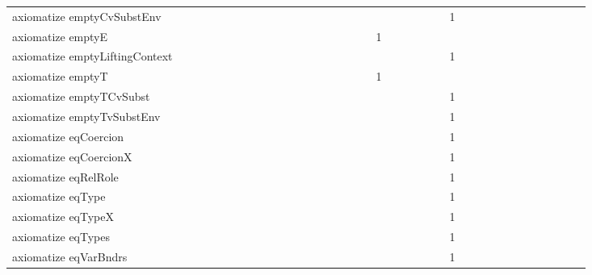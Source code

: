 {\begin{tabular}{l|rrr|rrr|rrr}
axiomatize emptyCvSubstEnv &  &  &  &  &  &  &  &  &  &  &  &  &  &  &  &  &  &  &  &  &  &  &  & 1 &  &  &  &  &  &  &  &  &  &  &  & \\
axiomatize emptyE &  &  &  &  &  &  &  &  &  &  &  &  &  &  &  &  &  & 1 &  &  &  &  &  &  &  &  &  &  &  &  &  &  &  &  &  & \\
axiomatize emptyLiftingContext &  &  &  &  &  &  &  &  &  &  &  &  &  &  &  &  &  &  &  &  &  &  &  & 1 &  &  &  &  &  &  &  &  &  &  &  & \\
axiomatize emptyT &  &  &  &  &  &  &  &  &  &  &  &  &  &  &  &  &  & 1 &  &  &  &  &  &  &  &  &  &  &  &  &  &  &  &  &  & \\
axiomatize emptyTCvSubst &  &  &  &  &  &  &  &  &  &  &  &  &  &  &  &  &  &  &  &  &  &  &  & 1 &  &  &  &  &  &  &  &  &  &  &  & \\
axiomatize emptyTvSubstEnv &  &  &  &  &  &  &  &  &  &  &  &  &  &  &  &  &  &  &  &  &  &  &  & 1 &  &  &  &  &  &  &  &  &  &  &  & \\
axiomatize eqCoercion &  &  &  &  &  &  &  &  &  &  &  &  &  &  &  &  &  &  &  &  &  &  &  & 1 &  &  &  &  &  &  &  &  &  &  &  & \\
axiomatize eqCoercionX &  &  &  &  &  &  &  &  &  &  &  &  &  &  &  &  &  &  &  &  &  &  &  & 1 &  &  &  &  &  &  &  &  &  &  &  & \\
axiomatize eqRelRole &  &  &  &  &  &  &  &  &  &  &  &  &  &  &  &  &  &  &  &  &  &  &  & 1 &  &  &  &  &  &  &  &  &  &  &  & \\
axiomatize eqType &  &  &  &  &  &  &  &  &  &  &  &  &  &  &  &  &  &  &  &  &  &  &  & 1 &  &  &  &  &  &  &  &  &  &  &  & \\
axiomatize eqTypeX &  &  &  &  &  &  &  &  &  &  &  &  &  &  &  &  &  &  &  &  &  &  &  & 1 &  &  &  &  &  &  &  &  &  &  &  & \\
axiomatize eqTypes &  &  &  &  &  &  &  &  &  &  &  &  &  &  &  &  &  &  &  &  &  &  &  & 1 &  &  &  &  &  &  &  &  &  &  &  & \\
axiomatize eqVarBndrs &  &  &  &  &  &  &  &  &  &  &  &  &  &  &  &  &  &  &  &  &  &  &  & 1 &  &  &  &  &  &  &  &  &  &  &  & \\

\end{tabular}}

